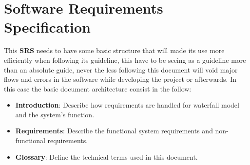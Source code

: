 

\renewcommand{\headrulewidth}{0.1pt}
\renewcommand{\footrulewidth}{0.1pt}

\section*{Software Requirements Specification}

This \textbf{SRS} needs to have some basic structure that will made its use more efficiently when following its guideline, this have to be seeing as a guideline more than an absolute guide, never the less following this document will void major flows and errors in the software while developing the project or afterwards. In this case the basic document architecture consist in the follow:

\begin{itemize}%
  \renewcommand{\labelitemi}{$\Rightarrow$}
 	\item \textbf{Introduction}: Describe how requirements are handled for waterfall model and the system’s function.
 	
	\item \textbf{Requirements}: Describe the functional system requirements and non-functional requirements.
	
	\item \textbf{Glossary}: Define the technical terms used in this document. 
\end{itemize}



